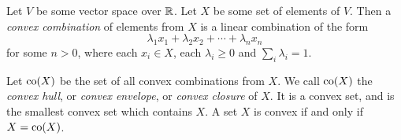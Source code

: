 \documentclass{article}
\begin{document}
Let $V$ be some vector space over $\Bbb{R}$.  Let $X$ be some set of elements of $V$.  Then a {\it convex combination} of elements from $X$ is a linear combination of the form 
$$\lambda_1 x_1 + \lambda_2 x_2 + \cdots + \lambda_n x_n$$
for some $n > 0$, where each $x_i \in X$, each $\lambda_i \ge 0$ and $\sum_i \lambda_i = 1$.

Let ${\rm co}(X)$ be the set of all convex combinations from $X$.  We call ${\rm co}(X)$ the {\it convex hull}, or {\it convex envelope}, or {\it convex closure} of $X$.  It is a convex set, and is the smallest convex set which contains $X$.  A set $X$ is convex if and only if $X = {\rm co}(X)$.
\end{document}
